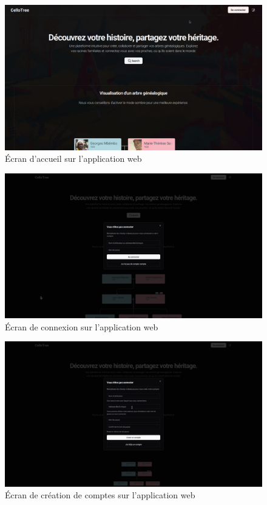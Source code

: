\begin{figure}[H]
  \centering
  \includegraphics[width=1\textwidth]{./capture/home.png}
  \caption{Écran d'accueil sur l'application web}
\end{figure}

\begin{figure}[H]
  \centering
  \includegraphics[width=1\textwidth]{capture/login.png}
  \caption{Écran de connexion sur l'application web}
\end{figure}

\begin{figure}[H]
  \centering
  \includegraphics[width=1\textwidth]{capture/signup.png}
  \caption{Écran de création de comptes sur l'application web}
\end{figure}

